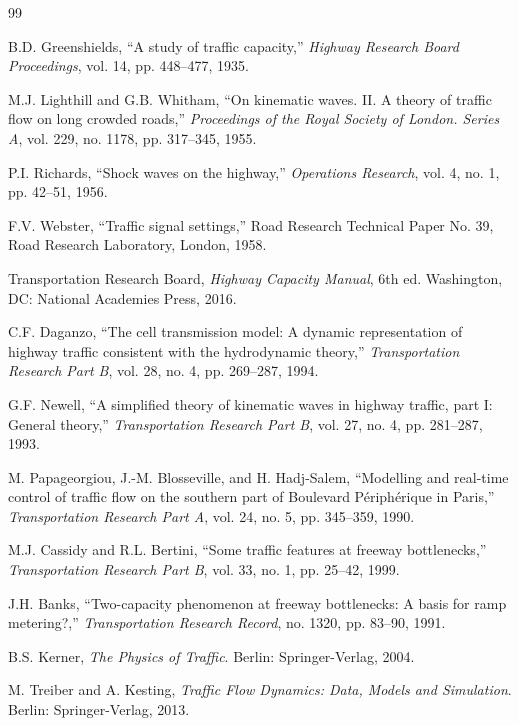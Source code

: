 \documentclass[11pt,a4paper]{article}
\begin{document}
\begin{thebibliography}{99}

B.D. Greenshields, ``A study of traffic capacity,'' \textit{Highway Research Board Proceedings}, vol. 14, pp. 448--477, 1935.

M.J. Lighthill and G.B. Whitham, ``On kinematic waves. II. A theory of traffic flow on long crowded roads,'' \textit{Proceedings of the Royal Society of London. Series A}, vol. 229, no. 1178, pp. 317--345, 1955.

P.I. Richards, ``Shock waves on the highway,'' \textit{Operations Research}, vol. 4, no. 1, pp. 42--51, 1956.

F.V. Webster, ``Traffic signal settings,'' Road Research Technical Paper No. 39, Road Research Laboratory, London, 1958.

Transportation Research Board, \textit{Highway Capacity Manual}, 6th ed. Washington, DC: National Academies Press, 2016.

C.F. Daganzo, ``The cell transmission model: A dynamic representation of highway traffic consistent with the hydrodynamic theory,'' \textit{Transportation Research Part B}, vol. 28, no. 4, pp. 269--287, 1994.

G.F. Newell, ``A simplified theory of kinematic waves in highway traffic, part I: General theory,'' \textit{Transportation Research Part B}, vol. 27, no. 4, pp. 281--287, 1993.

M. Papageorgiou, J.-M. Blosseville, and H. Hadj-Salem, ``Modelling and real-time control of traffic flow on the southern part of Boulevard Périphérique in Paris,'' \textit{Transportation Research Part A}, vol. 24, no. 5, pp. 345--359, 1990.

M.J. Cassidy and R.L. Bertini, ``Some traffic features at freeway bottlenecks,'' \textit{Transportation Research Part B}, vol. 33, no. 1, pp. 25--42, 1999.

J.H. Banks, ``Two-capacity phenomenon at freeway bottlenecks: A basis for ramp metering?,'' \textit{Transportation Research Record}, no. 1320, pp. 83--90, 1991.

B.S. Kerner, \textit{The Physics of Traffic}. Berlin: Springer-Verlag, 2004.

M. Treiber and A. Kesting, \textit{Traffic Flow Dynamics: Data, Models and Simulation}. Berlin: Springer-Verlag, 2013.


\end{thebibliography}
\end{document}
